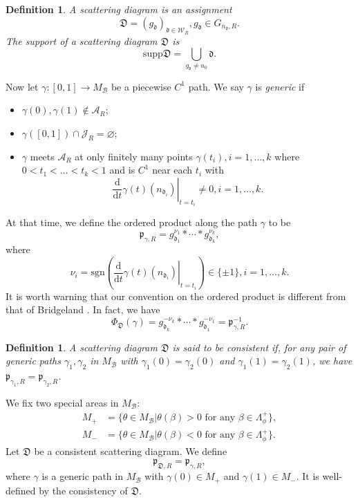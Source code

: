 \documentclass[a4paper,12pt]{amsart}
\numberwithin{equation}{section}
\newtheorem{definition}[theorem]{Definition}
\newcommand{\diff}{\mathrm{d}}
\newcommand{\supp}{\mathrm{supp}}
\newcommand{\sgn}{\mathrm{sgn}}
\newcommand{\1}{\mathbf{1}}
\begin{document}
\begin{definition}
    A \emph{scattering diagram} is an assignment
    \[\mathfrak{D}=(g_{\mathfrak{d}})_{\mathfrak{d}\in\mathcal{W}_R},g_{\mathfrak{d}}\in G_{n_{\mathfrak{d}},R}.\]
    The \emph{support} of a scattering diagram $\mathfrak{D}$ is
    \[\supp\mathfrak{D}=\bigcup_{g_{\mathfrak{d}}\neq u_0}\mathfrak{d}.\]
\end{definition}
Now let $\gamma:[0,1]\rightarrow M_\mathcal{B}$ be a piecewise $C^1$ path. We say $\gamma$ is \emph{generic} if
\begin{itemize}
    \item $\gamma(0),\gamma(1)\notin\mathcal{A}_R$;
    \item $\gamma([0,1])\cap\mathcal{J}_R=\varnothing$;
    \item $\gamma$ meets $\mathcal{A}_R$ at only finitely many points $\gamma(t_i),i=1,\dots,k$ where $0<t_1<\dots<t_k<1$ and is $C^1$ near each $t_i$ with
    \[\left.\dfrac{\diff}{\diff t}\gamma(t)(n_{\mathfrak d_i})\right|_{t=t_i}\neq0,i=1,\dots,k.\]
\end{itemize}
At that time, we define the ordered product along the path $\gamma$ to be
\begin{equation}\label{scattering path product}
 \mathfrak p_{\gamma,R}=g_{\mathfrak d_1}^{\nu_1}*\cdots*g_{\mathfrak d_k}^{\nu_k},
\end{equation}
where
\[\nu_i=\sgn\left(\left.\dfrac{\diff}{\diff t}\gamma(t)(n_{\mathfrak d_i})\right|_{t=t_i}\right)\in\{\pm1\},i=1,\dots,k.\]
It is worth warning that our convention on the ordered product is different from that of Bridgeland \cite{Bri2017}. In fact, we have
\[\Phi_{\mathfrak D}(\gamma)=g_{\mathfrak d_k}^{-\nu_k}*\cdots*g_{\mathfrak d_1}^{-\nu_1}=\mathfrak p_{\gamma,R}^{-1}.\]
\begin{definition}
    A scattering diagram $\mathfrak{D}$ is said to be \emph{consistent} if, for any pair of generic paths $\gamma_1,\gamma_2$ in $M_\mathcal{B}$ with $\gamma_1(0)=\gamma_2(0)$ and $\gamma_1(1)=\gamma_2(1)$, we have $\mathfrak{p}_{\gamma_1,R}=\mathfrak{p}_{\gamma_2,R}$.
\end{definition}
We fix two special areas in $M_\mathcal{B}$:
\begin{align*}
    M_+&=\{\theta\in M_\mathcal{B}|\theta(\beta)>0\text{ for any }\beta\in\Lambda_\phi^+\},\\
    M_-&=\{\theta\in M_\mathcal{B}|\theta(\beta)<0\text{ for any }\beta\in\Lambda_\phi^+\}.
\end{align*}
Let $\mathfrak{D}$ be a consistent scattering diagram. We define 
\[\mathfrak{p}_{\mathfrak{D},R}=\mathfrak{p}_{\gamma,R},\]
where $\gamma$ is a generic path in $M_\mathcal{B}$ with $\gamma(0)\in M_+$ and $\gamma(1)\in M_-$. It is well-defined by the consistency of $\mathfrak{D}$.
\end{document}
